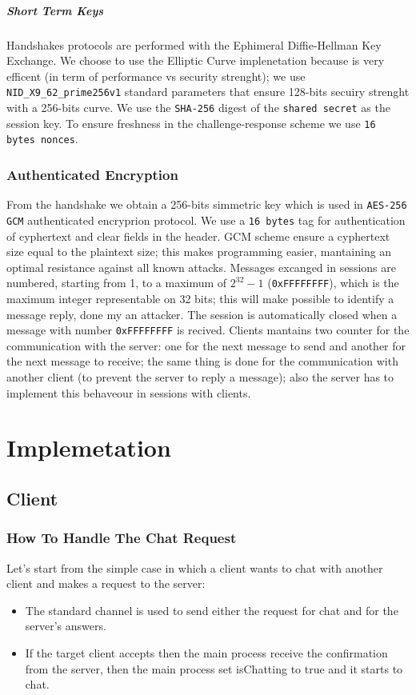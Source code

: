 \documentclass[11pt]{report}
\begin{document}
\paragraph*{Short Term Keys}
Handshakes protocols are performed with the Ephimeral Diffie-Hellman Key Exchange. 
We choose to use the Elliptic Curve implenetation because is very efficent (in term of performance vs security strenght);
we use \verb|NID_X9_62_prime256v1| standard parameters that ensure 128-bits secuiry strenght with a 256-bits curve. We use the \texttt{SHA-256} digest of the \texttt{shared secret} as
the session key.
To ensure freshness in the challenge-response scheme we use \texttt{16 bytes nonces}.
\subsection{Authenticated Encryption}
From the handshake we obtain a 256-bits simmetric key which is used in \texttt{AES-256 GCM} authenticated encryprion protocol.
We use a \texttt{16 bytes} tag for authentication of cyphertext and clear fields in the header. GCM scheme ensure a cyphertext
size equal to the plaintext size; this makes programming easier, mantaining an optimal resistance against all known attacks.
Messages excanged in sessions are numbered, starting from 1, to a maximum of $2^{32}-1$ (\verb|0xFFFFFFFF|), which is the
maximum integer representable on 32 bits; this will make possible to identify a message reply, done
my an attacker. The session is automatically closed when a message with number \verb|0xFFFFFFFF| is recived.
Clients mantains two counter for the communication with the server:  one for the next message to send and another for
the next message to receive; the same thing is done for the communication with another client (to prevent the server to 
reply a message); also the server has to implement this behaveour in sessions with clients.

\chapter{Implemetation}
\section{Client}

\subsection{How To Handle The Chat Request}
\noindent Let's start from the simple case in which a client wants to chat with another client and makes a request to the server: 
\begin{itemize}
	\item The standard channel is used to send either the request for chat and for the server's answers.
	\item If the target client accepts then the main process receive the confirmation from the server, then the main process set isChatting to true and it starts to chat.
\end{itemize}
\end{document}
